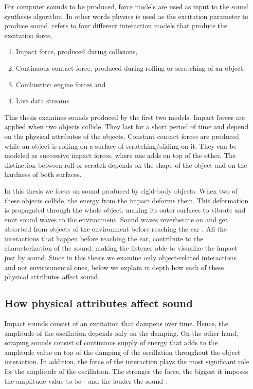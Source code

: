 For computer sounds to be produced, force models are used as input to the sound synthesis algorithm. In other words physics is used as the excitation parameter to produce sound. \cite{van2003modal} refers to four different interaction models that produce the excitation force.

\begin{enumerate}
\item Impact force, produced during collisions,
\item Continuous contact force, produced during rolling or scratching of an object,
\item Combustion engine forces and
\item Live data streams
\end{enumerate}

This thesis examines sounds produced by the first two models. Impact forces are applied when two objects collide. They last for a short period of time and depend on the physical attributes of the objects. Constant contact forces are produced while an object is rolling on a surface of scratching/sliding on it. They can be modeled as successive impact forces, where one adds on top of the other. The distinction between roll or scratch depends on the shape of the object and on the hardness of both surfaces.

In this thesis we focus on sound produced by rigid-body objects. When two of these objects collide, the energy from the impact deforms them. This deformation is propagated through the whole object, making its outer surfaces to vibrate and emit sound waves to the environment. Sound waves reverberate on and get absorbed from objects of the environment before reaching the ear \cite{van1998sounds}. All the interactions that happen before reaching the ear, contribute to the characterization of the sound, making the listener able to visualize the impact just by sound. Since in this thesis we examine only object-related interactions and not environmental ones, below we explain in depth how each of these physical attributes affect sound.

\subsection{How physical attributes affect sound}

Impact sounds consist of an excitation that dampens over time. Hence, the amplitude of the oscillation depends only on the damping. On the other hand, scraping sounds consist of continuous supply of energy that adds to the amplitude value on top of the damping of the oscillation throughout the object interaction. In addition, the force of the interaction plays the most significant role for the amplitude of the oscillation. The stronger the force, the biggest it imposes the amplitude value to be - and the louder the sound \cite{gaver1993world}.

